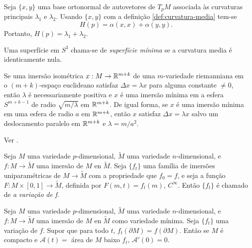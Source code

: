\begin{demonstracao}
	Seja $\{x,y\}$ uma base ortonormal de autovetores de $T_p M$ associada às curvaturas principais $\lambda_1$ e $\lambda_2$.
	Usando $\{x,y\}$ com a definição \ref{def:curvatura-media} tem-se
	\begin{equation*}
		H(p) = \alpha(x,x) + \alpha(y,y).
	\end{equation*}
	Portanto, $H(p) = \lambda_1 + \lambda_2$.
\end{demonstracao}

\begin{definicao}
	Uma superfície em $S^3$ chama-se de \emph{superfície mínima} se a curvatura media é identicamente nula.
\end{definicao}

\begin{teorema}\label{thm:takahashi}
	Se uma imersão isométrica $x: M \rightarrow \mathbb R^{m+k}$ de uma $m$-variedade riemanniana em o $(m+k)$-espaço euclideano satisfaz $ \Delta x = \lambda x $ para alguma constante $\neq 0$, então $\lambda$ é necessariamente positiva e $x$ é uma imersão mínima em a esfera $S^{m+k-1}$ de radio $\sqrt{m/\lambda}$ em $\mathbb R^{m+k}$. De igual forma, se $x$ é uma imersão mínima em uma esfera de radio $a$ em $\mathbb R^{m+k}$, então $x$ satisfaz $\Delta x = \lambda x$ salvo um deslocamento paralelo em $\mathbb R^{m+k}$ e $\lambda = m/a^2$.
\end{teorema}

\begin{demonstracao}
	Ver \cite[Theorem 3]{TAKAHASHI1966}.
\end{demonstracao}

\begin{definicao}
	Seja $M$ uma variedade $p$-dimensional, $\tilde{M}$ uma variedade $n$-dimensional, e $f: M \rightarrow \tilde{M}$ uma imersão de $M$ en $\tilde{M}$.
	Seja $\{ f_t \}$ uma família de imersões uniparamétricas de $M \rightarrow \tilde{M}$ com a propriedade que $f_0 = f$, e seja a função $F: M \times [0,1] \rightarrow \tilde{M}$, definida por $F(m,t) = f_t(m)$, $C^{\infty}$. Então $\{ f_t \}$ é chamado de \emph{a variação de f}.
\end{definicao}

\begin{teorema}\label{thm:minimo-e-compacto-implica-ser-ponto-minimo-do-funcional-de-area}
	Seja $M$ uma variedade $p$-dimensional, $\tilde{M}$ uma variedade $n$-dimensional, e $f: M \rightarrow \tilde{M}$ uma imersão de $M$ en $\tilde{M}$ como variedade mínima.
	Seja $\{ f_t \}$ uma variação de $f$. Supor que para todo $t$, $ f_t(\partial M) = f(\partial M) $. Então se $M$ é compacto e $\mathcal{A}(t) =$ área de $M$ baixo $f_t$, $\mathcal{A}'(0)=0$.
\end{teorema}

